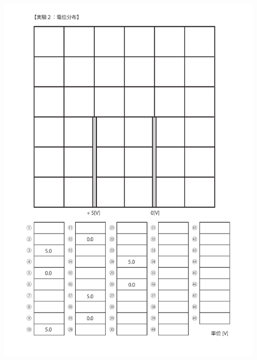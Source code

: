 \documentclass[uplatex,a4paper,11pt,oneside,openany]{jsbook}
\begin{document}
\includegraphics[scale=0.8]{./figure/E9.pdf}

\newpage
\end{document}

